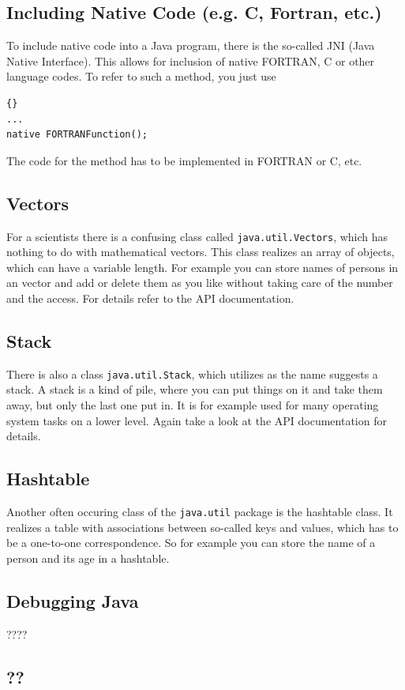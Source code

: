 \subsection{Including Native Code (e.g. C, Fortran, etc.)}
To include native code into a Java program, there is the so-called
JNI (Java Native Interface). This allows for inclusion of native
FORTRAN, C or other language codes. To refer to such a method,
you just use
\begin{lstlisting}{}
...
native FORTRANFunction();
\end{lstlisting}
The code for the method has to be implemented in FORTRAN or C, etc.

\subsection{Vectors}
For a scientists there is a confusing class called \verb|java.util.Vectors|, 
which has nothing to do with mathematical vectors. This class realizes
an array of objects, which can have a variable length. For example
you can store names of persons in an vector and add or delete them as
you like without taking care of the number and the access. For details
refer to the API documentation.

\subsection{Stack}
There is also a class \verb|java.util.Stack|, which utilizes as the
name suggests a stack. A stack is a kind of pile, where you can put
things on it and take them away, but only the last one put in. It is
for example used for many operating system tasks on a lower level.
Again take a look at the API documentation for details.

\subsection{Hashtable}
Another often occuring class of the \verb|java.util| package is the
hashtable class. It realizes a table with associations between so-called
keys and values, which has to be a one-to-one correspondence. So for
example you can store the name of a person and its age in a hashtable.


\subsection{Debugging Java}
????

\subsection{??}




